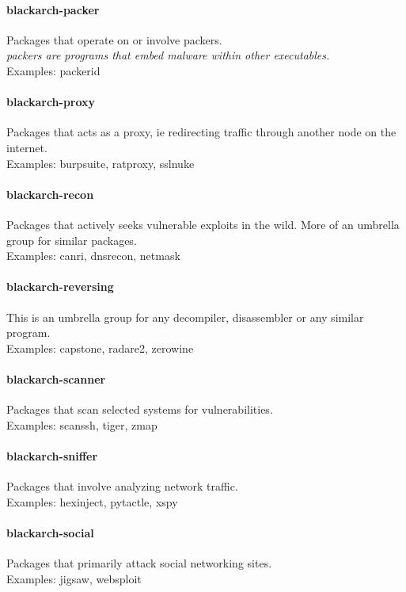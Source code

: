 \documentclass[a4paper, oneside,12pt]{scrartcl}
\begin{document}
\paragraph{blackarch-packer}
Packages that operate on or involve packers.
\\
\textit{packers are programs that embed malware within other executables.}
\\
Examples: packerid

\paragraph{blackarch-proxy}
Packages that acts as a proxy, ie redirecting traffic
through another node on the internet.
\\
Examples: burpsuite, ratproxy, sslnuke

\paragraph{blackarch-recon}
Packages that actively seeks vulnerable exploits in the
wild. More of an umbrella group for similar packages.
\\
Examples: canri, dnsrecon, netmask

\paragraph{blackarch-reversing}
This is an umbrella group for any decompiler,
disassembler or any similar program.
\\
Examples: capstone, radare2, zerowine

\paragraph{blackarch-scanner}
Packages that scan selected systems for vulnerabilities.
\\
Examples: scanssh, tiger, zmap

\paragraph{blackarch-sniffer}
Packages that involve analyzing network traffic.
\\
Examples: hexinject, pytactle, xspy

\paragraph{blackarch-social}
Packages that primarily attack social networking sites.
\\
Examples: jigsaw, websploit
\end{document}
